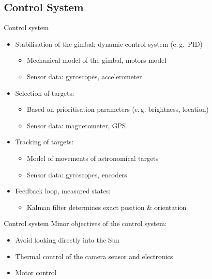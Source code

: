 \documentclass[11pt, aspectratio=169]{beamer}
\begin{document}
\subsection{Control System} 	%
\begin{frame}[t]{Control system}
\begin{itemize}
	\item<1-> Stabilisation of the gimbal: dynamic control system (e.\,g.~PID) %
	\begin{itemize}
		\item Mechanical model of the gimbal, motors model
		\item Sensor data: gyroscopes, accelerometer%
	\end{itemize}
	\item<2-> Selection of targets: %
	\begin{itemize}
		\item Based on prioritisation parameters (e.\,g. brightness, location)
		\item Sensor data: magnetometer, GPS %
	\end{itemize}
	\item<3-> Tracking of targets: 
	\begin{itemize}
		\item Model of movements of astronomical targets
		\item Sensor data: gyroscopes, encoders
	\end{itemize}
	\item<4-> Feedback loop, measured states: 
	\begin{itemize}
		\item Kalman filter determines exact position \& orientation
	\end{itemize}
\end{itemize}

\end{frame}

\begin{frame}[t]{Control system}
Minor objectives of the control system:
\begin{itemize}
	\item Avoid looking directly into the Sun
	\item Thermal control of the camera sensor and electronics
	\item Motor control
\end{itemize}

\end{frame}
\end{document}

